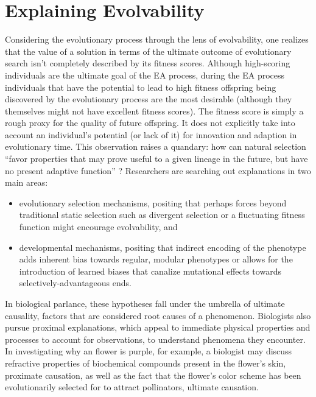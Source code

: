 \section{Explaining Evolvability} \label{sec:explaining}

Considering the evolutionary process through the lens of evolvability, one realizes that the value of a solution in terms of the ultimate outcome of evolutionary search isn't completely described by its fitness scores. Although high-scoring individuals are the ultimate goal of the EA process, during the EA process individuals that have the potential to lead to high fitness offspring being discovered by the evolutionary process are the most desirable (although they themselves might not have excellent fitness scores). The fitness score is simply a rough proxy for the quality of future offspring. It does not explicitly take into account an individual's potential (or lack of it) for innovation and adaption in evolutionary time. This observation raises a quandary: how can natural selection ``favor properties that may prove useful to a given lineage in the future, but have no present adaptive function'' \cite{Pigliucci2008IsEvolvable}? Researchers are searching out explanations in two main areas: 
\begin{itemize}
\item evolutionary selection mechanisms, positing that perhaps forces beyond traditional static selection such as divergent selection or a fluctuating fitness function might encourage evolvability, and
\item developmental mechanisms, positing that indirect encoding of the phenotype adds inherent bias towards regular, modular phenotypes or allows for the introduction of learned biases that canalize mutational effects towards selectively-advantageous ends.
\end{itemize}
In biological parlance, these hypotheses fall under the umbrella of ultimate causality, factors that are considered root causes of a phenomenon. Biologists also pursue proximal explanations, which appeal to immediate physical properties and processes to account for observations, to understand phenomena they encounter. In investigating why an flower is purple, for example, a biologist may discuss refractive properties of biochemical compounds present in the flower's skin, proximate causation, as well as the fact that the flower's color scheme has been evolutionarily selected for to attract pollinators, ultimate causation. 
